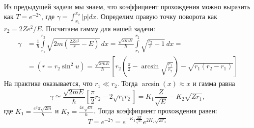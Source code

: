 Из предыдущей задачи мы знаем, что коэффициент прохождения можно выразить как $T = e^{-2\gamma}$, где $\gamma = \int_{x_1}^{x_2}|p| dx$. Определим правую точку поворота как $r_2 = 2Ze^2/E$. Посчитаем гамму для нашей задачи:
\begin{align*}
    \gamma & = \frac{1}{\hbar}\int\limits_{r_1}^{r_2}\sqrt{2m\left(\frac{2Ze^2}{r} - E\right)} \, dx = \frac{\sqrt{2 m E}}{\hbar} \int\limits_{r_1}^{r_2} \sqrt{\frac{r_2}{r} - 1} \, dx = \\
    &= \left(r = r_2\sin^2 u\right) = \frac{\sqrt{2 m E}}{\hbar}\left[ r_2\left( \frac{\pi}{2} - \arcsin\sqrt{\frac{r_1}{r_2}} \right) - \sqrt{r_1 (r_2 - r_1)}\right]
\end{align*}
На практике оказывается, что $r_1 \ll r_2$. Тогда $\arcsin (x)\approx x$ и гамма равна
\[
\gamma \simeq \frac{\sqrt{2 m E}}{\hbar}\left[ \frac{\pi}{2}r_2 - 2\sqrt{r_1 r_2} \right] = K_1\frac{Z}{\sqrt{E}} - K_2\sqrt{Zr_1},
\]
где $K_1 = \frac{e^2\pi\sqrt{2m}}{\hbar}$ и $K_2 = \frac{4e\sqrt{m}}{\hbar}$. Тогда коэффициент прохождения равен:
\[
T = e^{-2\gamma} = e^{- K_1\frac{2Z}{\sqrt{E}}}e^{2K_2\sqrt{Zr_1}}
\]
